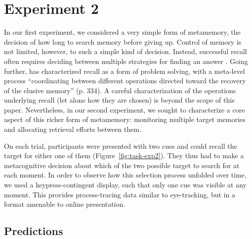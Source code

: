 \section{Experiment 2}

In our first experiment, we considered a very simple form of metamemory, the decision of how long to search memory before giving up. Control of memory is not limited, however, to such a simple kind of decision. Instead, successful recall often requires deciding between multiple strategies for finding an answer \citep{reder1988strategic}. Going further, \citet{koriat2000control} has characterized recall as a form of problem solving, with a meta-level process ``coordinating between different operations directed toward the recovery of the elusive memory'' (p. 334). A careful characterization of the operations underlying recall (let alone how they are chosen) is beyond the scope of this paper. Nevertheless, in our second experiment, we sought to characterize a core aspect of this richer form of metamemory: monitoring multiple target memories and allocating retrieval efforts between them. 

On each trial, participants were presented with two cues and could recall the target for either one of them (Figure~\ref{fig:task-exp2}). They thus had to make a metacognitive decision about which of the two possible target to search for at each moment. In order to observe how this selection process unfolded over time, we used a keypress-contingent display, such that only one cue was visible at any moment. This provides process-tracing data similar to eye-tracking, but in a format amenable to online presentation.

\subsection{Predictions}

